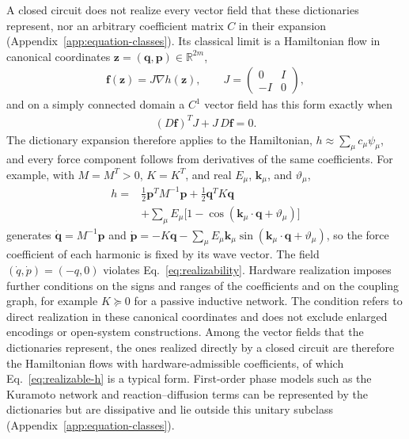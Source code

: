 \documentclass[pra,twocolumn,superscriptaddress,nofootinbib,floatfix]{revtex4-2}
\theoremstyle{remark}
\newcommand{\revcolor}{\color{blue}}
\DeclareRobustCommand{\rev}[1]{{\revcolor #1}}
\begin{document}
\rev{A closed circuit does not realize every vector field that these dictionaries represent, nor an arbitrary coefficient matrix \(C\) in their expansion (Appendix~\ref{app:equation-classes}).} \rev{Its classical limit is a Hamiltonian flow in canonical coordinates \(\mathbf z=(\mathbf q,\mathbf p)\in\mathbb R^{2m}\),}
\begingroup\revcolor
\begin{align}
\mathbf f(\mathbf z)=J\nabla h(\mathbf z),\qquad J=\begin{pmatrix}0&I\\-I&0\end{pmatrix},
\label{eq:hamiltonian-flow}
\end{align}
\endgroup
\rev{and on a simply connected domain a \(C^1\) vector field has this form exactly when}
\begingroup\revcolor
\begin{align}
(D\mathbf f)^{T}J+J\,D\mathbf f=0.
\label{eq:realizability}
\end{align}
\endgroup
\rev{The dictionary expansion therefore applies to the Hamiltonian, \(h\approx\sum_\mu c_\mu\psi_\mu\), and every force component follows from derivatives of the same coefficients.} \rev{For example, with \(M=M^T>0\), \(K=K^T\), and real \(E_\mu\), \(\mathbf k_\mu\), and \(\vartheta_\mu\),}
\begingroup\revcolor
\begin{align}
h={}&\tfrac12\mathbf p^{T}M^{-1}\mathbf p+\tfrac12\mathbf q^{T}K\mathbf q\nonumber\\
&+\sum_\mu E_\mu\big[1-\cos(\mathbf k_\mu\cdot\mathbf q+\vartheta_\mu)\big]
\label{eq:realizable-h}
\end{align}
\endgroup
\rev{generates \(\dot{\mathbf q}=M^{-1}\mathbf p\) and \(\dot{\mathbf p}=-K\mathbf q-\sum_\mu E_\mu\mathbf k_\mu\sin(\mathbf k_\mu\cdot\mathbf q+\vartheta_\mu)\), so the force coefficient of each harmonic is fixed by its wave vector.} \rev{The field \((\dot q,\dot p)=(-q,0)\) violates Eq.~\eqref{eq:realizability}.} \rev{Hardware realization imposes further conditions on the signs and ranges of the coefficients and on the coupling graph, for example \(K\succeq0\) for a passive inductive network.} \rev{The condition refers to direct realization in these canonical coordinates and does not exclude enlarged encodings or open-system constructions.} \rev{Among the vector fields that the dictionaries represent, the ones realized directly by a closed circuit are therefore the Hamiltonian flows with hardware-admissible coefficients, of which Eq.~\eqref{eq:realizable-h} is a typical form.} \rev{First-order phase models such as the Kuramoto network and reaction--diffusion terms can be represented by the dictionaries but are dissipative and lie outside this unitary subclass (Appendix~\ref{app:equation-classes}).}
\end{document}

